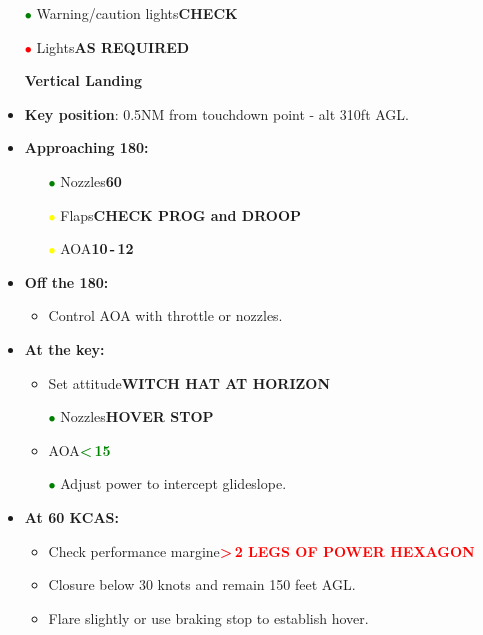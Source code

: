 \documentclass[a4paper,12pt,dvipsnames]{letter}
\newcommand{\button}[1]{\textbf{#1}}
\newcommand{\Deg}{\textdegree{}}
\newcommand{\ok}[1]{\textcolor{Green}{\textbf{#1}}}
\newcommand{\warn}[1]{\textcolor{Red}{\textbf{#1}}}
\newcommand{\ri}{\textcolor{red}{$\bullet$\;}}
\newcommand{\gi}{\textcolor{Green}{$\bullet$\;}}
\newcommand{\yi}{\textcolor{Yellow}{$\bullet$\;}}
\begin{document}
{\begin{itemize}
\begin{itemize}
 \item Green water flow light in HUD\dotfill\button{CHECK}
 \item[\yi] Water switch\dotfill\button{AS REQUIRED}
\end{itemize}
\item[\gi] Warning/caution lights\dotfill\button{CHECK}
\item[\ri] Lights\dotfill\button{AS REQUIRED}
\end{itemize}
\newpage
\begin{itemize}
\item[] {\LARGE\textbf{Vertical Landing}}
\item \button{Key position}: 0.5\;NM from touchdown point - alt 310\;ft AGL.
\item \button{Approaching 180:}
\begin{itemize}
 \item[\gi] Nozzles\dotfill\button{60\Deg}
 \item[\yi] Flaps\dotfill\button{CHECK PROG and DROOP}
 \item[\yi] AOA\dotfill\button{10\Deg\,-\,12\Deg}
\end{itemize}
\item \button{Off the 180:}
\begin{itemize}
 \item Control AOA with throttle or nozzles.
\end{itemize}
\item \button{At the key:}
\begin{itemize}
 \item Set attitude\dotfill\button{WITCH HAT AT HORIZON}
 \item[\gi] Nozzles\dotfill\button{HOVER STOP}
 \item AOA\dotfill\ok{<\,15\Deg}
 \item[\gi] Adjust power to intercept glideslope.
\end{itemize}
\item \button{At 60 KCAS:}
\begin{itemize}
 \item Check performance margine\dotfill\warn{>\,2 LEGS OF POWER HEXAGON}
 \item Closure below 30 knots and remain 150 feet AGL.
 \item Flare slightly or use braking stop to establish hover.

\end{itemize}
\end{itemize}}
\end{document}

